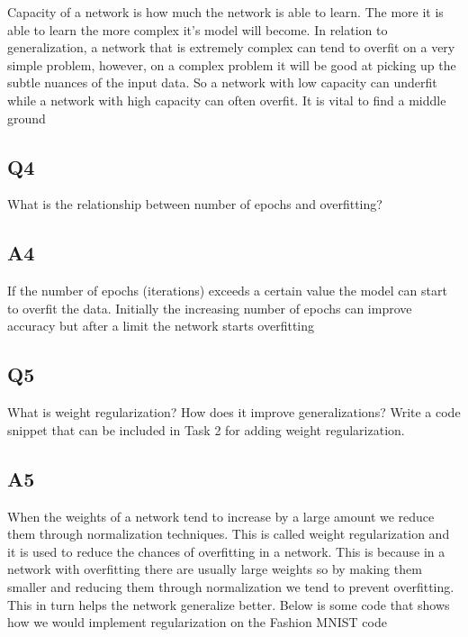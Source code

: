 \documentclass[a4paper, 12pt]{article}
\begin{document}
    Capacity of a network is how much the network is able to learn. The more it is able to learn the more complex it's model will become. In relation to generalization, a network that is extremely complex can tend to overfit on a very simple problem, however, on a complex problem it will be good at picking up the subtle nuances of the input data. So a network with low capacity can underfit while a network with high capacity can often overfit. It is vital to find a middle ground

    \subsection{Q4}

    What is the relationship between number of epochs and overfitting?

    \subsection{A4}

    If the number of epochs (iterations) exceeds a certain value the model can start to overfit the data. Initially the increasing number of epochs can improve accuracy but after a limit the network starts overfitting

    \subsection{Q5}

    What is weight regularization? How does it improve generalizations? Write a code snippet that can be included in Task 2 for adding weight regularization.

    \subsection{A5}

    When the weights of a network tend to increase by a large amount we reduce them through normalization techniques. This is called weight regularization and it is used to reduce the chances of overfitting in a network. This is because in a network with overfitting there are usually large weights so by making them smaller and reducing them through normalization we tend to prevent overfitting. This in turn helps the network generalize better. Below is some code that shows how we would implement regularization on the Fashion MNIST code
\end{document}
